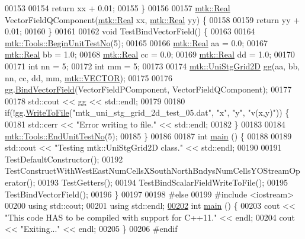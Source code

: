\begin{DoxyCode}
00153 
00154   \textcolor{keywordflow}{return} xx + 0.01;
00155 \}
00156 
00157 \hyperlink{group__c01-roots_gac080bbbf5cbb5502c9f00405f894857d}{mtk::Real} VectorFieldQComponent(\hyperlink{group__c01-roots_gac080bbbf5cbb5502c9f00405f894857d}{mtk::Real} xx, \hyperlink{group__c01-roots_gac080bbbf5cbb5502c9f00405f894857d}{mtk::Real} yy) \{
00158 
00159   \textcolor{keywordflow}{return} yy + 0.01;
00160 \}
00161 
00162 \textcolor{keywordtype}{void} TestBindVectorField() \{
00163 
00164   \hyperlink{classmtk_1_1Tools_a26ee906d28523378522a75e25c3a4e19}{mtk::Tools::BeginUnitTestNo}(5);
00165 
00166   \hyperlink{group__c01-roots_gac080bbbf5cbb5502c9f00405f894857d}{mtk::Real} aa = 0.0;
00167   \hyperlink{group__c01-roots_gac080bbbf5cbb5502c9f00405f894857d}{mtk::Real} bb = 1.0;
00168   \hyperlink{group__c01-roots_gac080bbbf5cbb5502c9f00405f894857d}{mtk::Real} cc = 0.0;
00169   \hyperlink{group__c01-roots_gac080bbbf5cbb5502c9f00405f894857d}{mtk::Real} dd = 1.0;
00170 
00171   \textcolor{keywordtype}{int} nn = 5;
00172   \textcolor{keywordtype}{int} mm = 5;
00173 
00174   \hyperlink{classmtk_1_1UniStgGrid2D}{mtk::UniStgGrid2D} gg(aa, bb, nn, cc, dd, mm, \hyperlink{namespacemtk_ga4c54f2a329cfb4e56213b02a259d19e2a3d8cb27a993651a74d67fb8c98ae91b2}{mtk::VECTOR});
00175 
00176   gg.\hyperlink{classmtk_1_1UniStgGrid2D_a1cba89c285973514c1351760d598c52b}{BindVectorField}(VectorFieldPComponent, VectorFieldQComponent);
00177 
00178   std::cout << gg << std::endl;
00179 
00180   \textcolor{keywordflow}{if}(!gg.\hyperlink{classmtk_1_1UniStgGrid2D_a1787a79e4bcee6b89c681dc7e5e2d7bc}{WriteToFile}(\textcolor{stringliteral}{"mtk\_uni\_stg\_grid\_2d\_test\_05.dat"}, \textcolor{stringliteral}{"x"}, \textcolor{stringliteral}{"y"}, \textcolor{stringliteral}{"v(x,y)"})) \{
00181     std::cerr << \textcolor{stringliteral}{"Error writing to file."} << std::endl;
00182   \}
00183 
00184   \hyperlink{classmtk_1_1Tools_ad8cf0085133dd40c913fe195bc5b9694}{mtk::Tools::EndUnitTestNo}(5);
00185 \}
00186 
00187 \textcolor{keywordtype}{int} \hyperlink{mtk__uni__stg__grid__2d__test_8cc_ae66f6b31b5ad750f1fe042a706a4e3d4}{main} () \{
00188 
00189   std::cout << \textcolor{stringliteral}{"Testing mtk::UniStgGrid2D class."} << std::endl;
00190 
00191   TestDefaultConstructor();
00192   TestConstructWithWestEastNumCellsXSouthNorthBndysNumCellsYOStreamOperator();
00193   TestGetters();
00194   TestBindScalarFieldWriteToFile();
00195   TestBindVectorField();
00196 \}
00197 
00198 \textcolor{preprocessor}{#else}
00199 \textcolor{preprocessor}{#include <iostream>}
00200 \textcolor{keyword}{using} std::cout;
00201 \textcolor{keyword}{using} std::endl;
\hypertarget{mtk__uni__stg__grid__2d__test_8cc_source_l00202}{}\hyperlink{mtk__uni__stg__grid__2d__test_8cc_ae66f6b31b5ad750f1fe042a706a4e3d4}{00202} \textcolor{keywordtype}{int} \hyperlink{mtk__uni__stg__grid__2d__test_8cc_ae66f6b31b5ad750f1fe042a706a4e3d4}{main} () \{
00203   cout << \textcolor{stringliteral}{"This code HAS to be compiled with support for C++11."} << endl;
00204   cout << \textcolor{stringliteral}{"Exiting..."} << endl;
00205 \}
00206 \textcolor{preprocessor}{#endif}
\end{DoxyCode}
